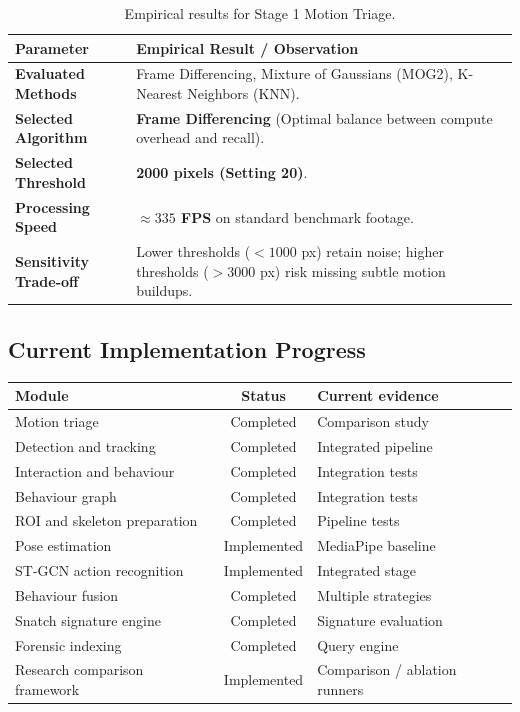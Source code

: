 \documentclass[11pt, a4paper]{article}
\begin{document}
\begin{table}[H]
\centering
\small
\renewcommand{\arraystretch}{1.3}
\begin{tabularx}{\textwidth}{|>{\hsize=0.3\hsize\bfseries}X|>{\hsize=0.7\hsize}X|}
\hline
\textbf{Parameter} & \textbf{Empirical Result / Observation} \\
\hline
Evaluated Methods & Frame Differencing, Mixture of Gaussians (MOG2), K-Nearest Neighbors (KNN). \\
\hline
Selected Algorithm & \textbf{Frame Differencing} (Optimal balance between compute overhead and recall). \\
\hline
Selected Threshold & \textbf{2000 pixels (Setting 20)}. \\
\hline
Processing Speed & \textbf{$\approx 335$ FPS} on standard benchmark footage. \\
\hline
Sensitivity Trade-off & Lower thresholds ($<1000$ px) retain noise; higher thresholds ($>3000$ px) risk missing subtle motion buildups. \\
\hline
\end{tabularx}
\caption{Empirical results for Stage 1 Motion Triage.}
\end{table}


\subsection{Current Implementation Progress}

\begin{table}[H]
\centering
\small
\renewcommand{\arraystretch}{1.3}
\begin{tabularx}{\textwidth}{|>{\hsize=0.4\hsize}X|c|>{\hsize=0.6\hsize}X|}
\hline
\textbf{Module} & \textbf{Status} & \textbf{Current evidence} \\
\hline
Motion triage & Completed & Comparison study \\
\hline
Detection and tracking & Completed & Integrated pipeline \\
\hline
Interaction and behaviour & Completed & Integration tests \\
\hline
Behaviour graph & Completed & Integration tests \\
\hline
ROI and skeleton preparation & Completed & Pipeline tests \\
\hline
Pose estimation & Implemented & MediaPipe baseline \\
\hline
ST-GCN action recognition & Implemented & Integrated stage \\
\hline
Behaviour fusion & Completed & Multiple strategies \\
\hline
Snatch signature engine & Completed & Signature evaluation \\
\hline
Forensic indexing & Completed & Query engine \\
\hline
Research comparison framework & Implemented & Comparison / ablation runners \\
\hline
\end{tabularx}
\end{table}
\end{document}
